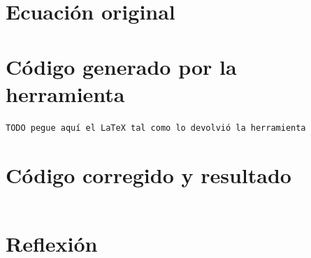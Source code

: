 \documentclass[12pt,a4paper]{article}
\begin{document}
\section{Ecuación original}

\section{Código generado por la herramienta}
\begin{Verbatim}[frame=single,fontsize=\small]
TODO pegue aquí el LaTeX tal como lo devolvió la herramienta
\end{Verbatim}

\section{Código corregido y resultado}
\begin{equation}
\end{equation}

\section{Reflexión}
\end{document}
